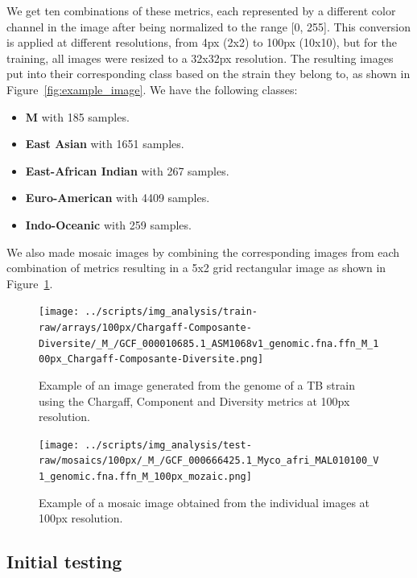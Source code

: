 We get ten combinations of these metrics, each represented by a different color channel in the image after being normalized to the range [0, 255].
This conversion is applied at different resolutions, from 4px (2x2) to 100px (10x10), but for the training, all images were resized to a 32x32px resolution.
The resulting images put into their corresponding class based on the strain they belong to, as shown in Figure~\ref{fig:example_image}. We have the following
classes:

\begin{itemize}
	\item \textbf{M} with 185 samples.
	\item \textbf{East Asian} with 1651 samples.
	\item \textbf{East-African Indian} with 267 samples.
	\item \textbf{Euro-American} with 4409 samples.
	\item \textbf{Indo-Oceanic} with 259 samples.
\end{itemize}

We also made mosaic images by combining the corresponding images from each combination of metrics resulting in a 5x2 grid rectangular image as shown
in Figure~\ref{fig:mosaic_example}.

\begin{figure}[H]
	\centering
	\begin{minipage}[t]{0.48\textwidth}
		\centering
		\texttt{[image: ../scripts/img\_analysis/train-raw/arrays/100px/Chargaff-Composante-Diversite/\_M\_/GCF\_000010685.1\_ASM1068v1\_genomic.fna.ffn\_M\_100px\_Chargaff-Composante-Diversite.png]}
		\caption{Example of an image generated from the genome of a TB strain using the Chargaff, Component and Diversity metrics at 100px resolution.}
		\label{fig:example_image}
	\end{minipage}\hfill
	\begin{minipage}[t]{0.48\textwidth}
		\centering
		\texttt{[image: ../scripts/img\_analysis/test-raw/mosaics/100px/\_M\_/GCF\_000666425.1\_Myco\_afri\_MAL010100\_V1\_genomic.fna.ffn\_M\_100px\_mozaic.png]}
		\caption{Example of a mosaic image obtained from the individual images at 100px resolution.}
		\label{fig:mosaic_example}
	\end{minipage}
\end{figure}


\subsection{Initial testing}
\label{subsec:initial_testing}

